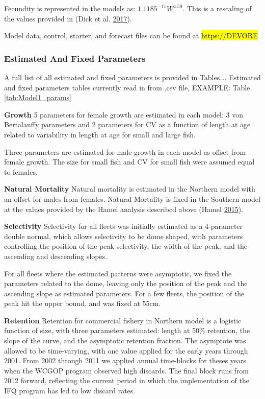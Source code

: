 \documentclass[12pt,]{article}
\begin{document}
Fecundity is represented in the models as: \(1.1185^{-11}W^{4.59}\).
This is a rescaling of the values provided in (Dick et al.
\protect\hyperlink{ref-Dick2017}{2017}).

Model data, control, starter, and forecast files can be found at
\hl{https://DEVORE}

\subsubsection{Estimated And Fixed
Parameters}\label{estimated-and-fixed-parameters}

A full list of all estimated and fixed parameters is provided in
Tables\ldots{}. Estimated and fixed parameters tables currently read in
from .csv file, EXAMPLE: Table \ref{tab:Model1_params}

\textbf{Growth} 5 parameters for female growth are estimated in each
model: 3 von Bertalanffy parameters and 2 parameters for CV as a
function of length at age related to variability in length at age for
small and large fish.

Three parameters are estimated for male growth in each model as offset
from female growth. The size for small fish and CV for small fish were
assumed equal to females.

\textbf{Natural Mortality} Natural mortality is estimated in the
Northern model with an offset for males from females. Natural Mortality
is fixed in the Southern model at the values provided by the Hamel
analysis described above (Hamel
\protect\hyperlink{ref-Hamel2015}{2015}).

\textbf{Selectivity} Selectivity for all fleets was initially estimated
as a 4-parameter double normal, which allows selectivity to be dome
shaped, with parameters controlling the position of the peak
selectivity, the width of the peak, and the ascending and descending
slopes.

For all fleets where the estimated patterns were asymptotic, we fixed
the parameters related to the dome, leaving only the position of the
peak and the ascending slope as estimated parameters. For a few fleets,
the position of the peak hit the upper bound, and was fixed at 55cm.

\textbf{Retention} Retention for commercial fishery in Northern model is
a logistic function of size, with three parameters estimated: length at
50\% retention, the slope of the curve, and the asymptotic retention
fraction. The asymptote was allowed to be time-varying, with one value
applied for the early years through 2001. From 2002 through 2011 we
applied annual time-blocks for theses years when the WCGOP program
observed high discards. The final block runs from 2012 forward,
reflecting the current period in which the implementation of the IFQ
program has led to low discard rates.
\end{document}

